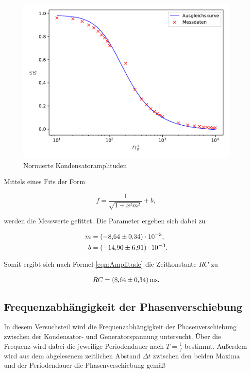 \begin{figure}
  \centering
  \includegraphics[scale=0.8]{content/plot2.pdf}
  \caption{Normierte Kondensatoramplituden}
  \label{fig:plot2}
\end{figure}

Mittels eines Fits der Form

\begin{equation*}
f = \frac{1}{\sqrt{1+x²m²}}+b,
\end{equation*}

werden die Messwerte gefittet. Die Parameter ergeben sich dabei zu

\begin{align*}
m &= \num{-8.64+-0.34e-3},\\
b &= \num{-14.90+-6.91e-3}.
\end{align*}

Somit ergibt sich nach Formel \eqref{eqn:Amplitude} die Zeitkonstante $RC$ zu

\begin{equation*}
RC = \SI{8.64+-0.34}{\milli\second}. 
\end{equation*}

\subsection{Frequenzabhängigkeit der Phasenverschiebung}

In diesem Versuchsteil wird die Frequenzabhängigkeit der Phasenverschiebung
zwischen der Kondensator- und Generatorspannung untersucht. Über die Frequenz 
wird dabei die jeweilige Periodendauer nach $T= \frac{1}{f}$ bestimmt. Außerdem
wird aus dem abgelesenem zeitlichen Abstand $\Delta t$ zwischen den beiden 
Maxima und der Periodendauer die Phasenverschiebung gemäß 

